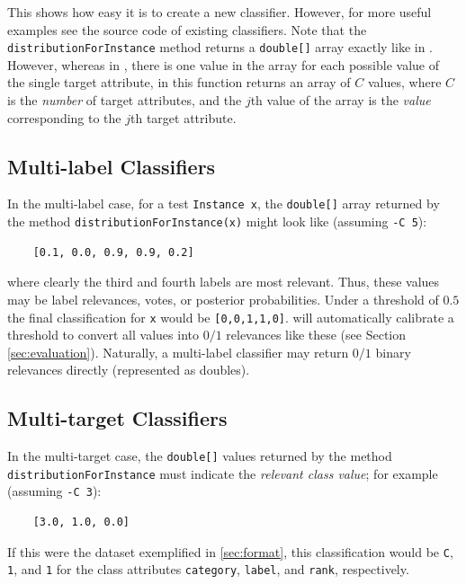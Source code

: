 \documentclass[11pt]{article}
\newcommand{\MEKA}{Meka}
\newcommand{\WEKA}{Weka}
\begin{document}
This shows how easy it is to create a new classifier. However, for more useful examples see the source code of existing \framework{\MEKA} classifiers. Note that the \texttt{distributionForInstance} method returns a \texttt{double[]} array exactly like in \framework{\WEKA}. However, whereas in \framework{\WEKA}, there is one value in the array for each possible value of the single target attribute, in \framework{\MEKA} this function returns an array of $C$ values, where $C$ is the \emph{number} of target attributes, and the $j$th value of the array is the \emph{value} corresponding to the $j$th target attribute.

\subsection{Multi-label Classifiers}

In the multi-label case, for a test \texttt{Instance x}, the \texttt{double[]} array returned by the method \texttt{distributionForInstance(x)} might look like (assuming \texttt{-C 5}):
\begin{verbatim}
	[0.1, 0.0, 0.9, 0.9, 0.2]
\end{verbatim} 
where clearly the third and fourth labels are most relevant. Thus, these values may be label relevances, votes, or posterior probabilities. Under a threshold of $0.5$ the final classification for \texttt{x} would be \texttt{[0,0,1,1,0]}. \framework{\MEKA} will {\blue automatically calibrate a threshold} to convert all values into $0/1$ relevances like these (see Section \ref{sec:evaluation}). Naturally, a multi-label classifier may return $0/1$ binary relevances directly (represented as doubles).

\subsection{Multi-target Classifiers}

In the multi-target case, the \texttt{double[]} values returned by the method \texttt{distributionForInstance} must indicate the \emph{relevant class value}; for example (assuming \texttt{-C 3}): 
\begin{verbatim}
	[3.0, 1.0, 0.0]
\end{verbatim} 
If this were the dataset exemplified in \ref{sec:format}, this classification would be \texttt{C}, \texttt{1}, and \texttt{1} for the class attributes \texttt{category}, \texttt{label}, and \texttt{rank}, respectively.
\end{document}

